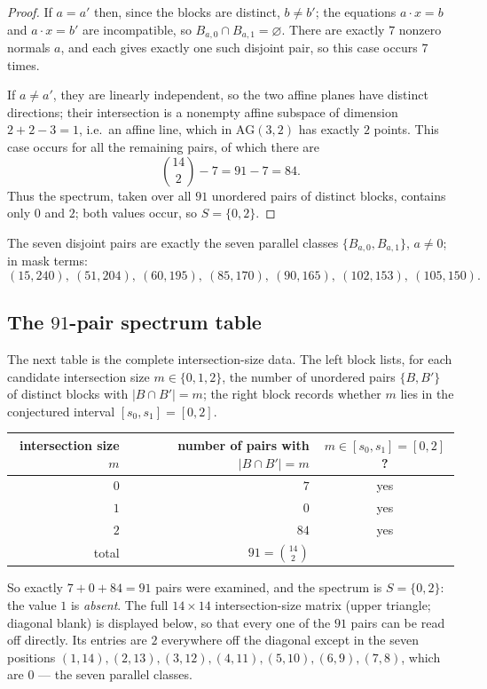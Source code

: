 \documentclass[11pt]{article}
\theoremstyle{definition}
\theoremstyle{remark}
\newcommand{\AG}{\mathrm{AG}}
\begin{document}
\begin{proof}
If $a = a'$ then, since the blocks are distinct, $b \neq b'$; the equations
$a\cdot x = b$ and $a\cdot x = b'$ are incompatible, so
$B_{a,0} \cap B_{a,1} = \varnothing$. There are exactly $7$ nonzero normals
$a$, and each gives exactly one such disjoint pair, so this case occurs
$7$ times.

If $a \neq a'$, they are linearly independent, so the two affine planes have
distinct directions; their intersection is a nonempty affine subspace of
dimension $2+2-3 = 1$, i.e.\ an affine line, which in $\AG(3,2)$ has exactly
$2$ points. This case occurs for all the remaining pairs, of which there are
\[
\binom{14}{2} - 7 = 91 - 7 = 84 .
\]
Thus the spectrum, taken over all $91$ unordered pairs of distinct blocks,
contains only $0$ and $2$; both values occur, so $S=\{0,2\}$.
\end{proof}

The seven disjoint pairs are exactly the seven parallel classes
$\{B_{a,0},B_{a,1}\}$, $a \neq 0$; in mask terms:
\[
(15,240),\ (51,204),\ (60,195),\ (85,170),\ (90,165),\ (102,153),\ (105,150).
\]

\subsection*{The $91$-pair spectrum table}

The next table is the complete intersection-size data. The left block lists,
for each candidate intersection size $m \in \{0,1,2\}$, the number of unordered
pairs $\{B,B'\}$ of distinct blocks with $|B\cap B'| = m$; the right block
records whether $m$ lies in the conjectured interval $[s_0,s_1]=[0,2]$.

\begin{center}
\begin{tabular}{r r c}
\toprule
intersection size $m$ & number of pairs with $|B\cap B'| = m$ & $m \in [s_0,s_1]=[0,2]$? \\
\midrule
$0$ & $7$  & yes \\
$1$ & $0$  & yes \\
$2$ & $84$ & yes \\
\midrule
total & $91 = \binom{14}{2}$ & \\
\bottomrule
\end{tabular}
\end{center}

So exactly $7 + 0 + 84 = 91$ pairs were examined, and the spectrum is
$S = \{0,2\}$: the value $1$ is \emph{absent}. The full $14 \times 14$
intersection-size matrix (upper triangle; diagonal blank) is displayed below,
so that every one of the $91$ pairs can be read off directly. Its entries are
$2$ everywhere off the diagonal except in the seven positions
$(1,14),(2,13),(3,12),(4,11),(5,10),(6,9),(7,8)$, which are $0$ --- the seven
parallel classes.
\end{document}
